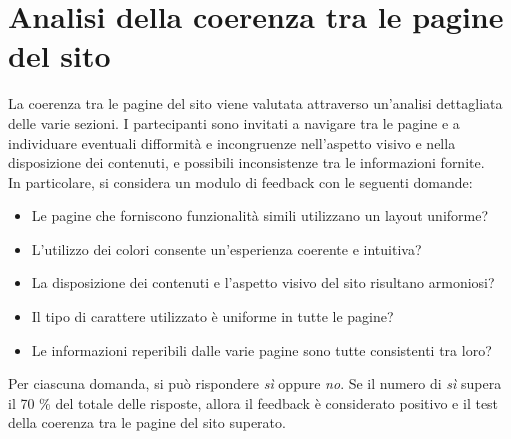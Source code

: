 \documentclass{article}
\begin{document}
\section{Analisi della coerenza tra le pagine del sito}
La coerenza tra le pagine del sito viene valutata attraverso un'analisi dettagliata delle varie sezioni. I partecipanti sono invitati a navigare tra le pagine e a individuare eventuali difformità e incongruenze nell'aspetto visivo e nella disposizione dei contenuti, e possibili inconsistenze tra le informazioni fornite.\\
In particolare, si considera un modulo di feedback con le seguenti domande:
\begin{itemize}
    \item Le pagine che forniscono funzionalità simili utilizzano un layout uniforme?
    \item L'utilizzo dei colori consente un'esperienza coerente e intuitiva?
    \item La disposizione dei contenuti e l'aspetto visivo del sito risultano armoniosi?
    \item Il tipo di carattere utilizzato è uniforme in tutte le pagine?
    \item Le informazioni reperibili dalle varie pagine sono tutte consistenti tra loro?
\end{itemize}
Per ciascuna domanda, si può rispondere \textit{sì} oppure \textit{no}. Se il numero di \textit{sì} supera il 70 \% del totale delle risposte, allora il feedback è considerato positivo e il test della coerenza tra le pagine del sito superato.

\vspace{0.7cm}
\end{document}
